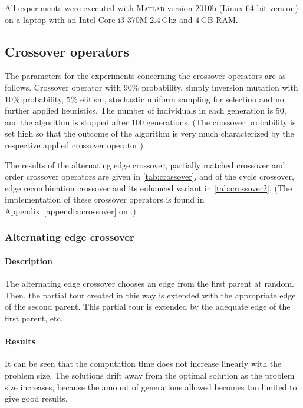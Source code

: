 \documentclass[a4paper,english,11pt,]{scrartcl}
\begin{document}
All experiments were executed with \textsc{Matlab} version 2010b (Linux 64 bit version) on a laptop with an Intel Core i3-370M 2.4\,Ghz and 4\,GB RAM.

\subsection{Crossover operators}

The parameters for the experiments concerning the crossover operators are as follows. Crossover operator with 90\% probability, simply inversion mutation with 10\% probability, 5\% elitism, stochastic uniform sampling for selection and no further applied heuristics. 
The number of individuals in each generation is 50, and the algorithm is stopped after 100 generations. 
(The crossover probability is set high so that the outcome of the algorithm is very much characterized by the respective applied crossover operator.)


The results of the alternating edge crossover, partially matched crossover and order crossover operators are given in \autoref{tab:crossover}, and of the cycle crossover, edge recombination crossover and its enhanced variant in \autoref{tab:crossover2}.
(The implementation of these crossover operators is found in Appendix~\ref{appendix:crossover} on .)
\subsubsection{Alternating edge crossover}
\paragraph{Description}
The alternating edge crossover chooses an edge from the first
parent at random. Then, the partial tour created in this way is extended
with the appropriate edge of the second parent. This partial tour is
extended by the adequate edge of the first parent, etc.

\paragraph{Results}
It can be seen that the computation time does not increase linearly with the problem size.  The solutions drift away from the optimal solution as the problem size increases, because the amount of generations allowed becomes too limited to give good results. 
% 
\end{document}
